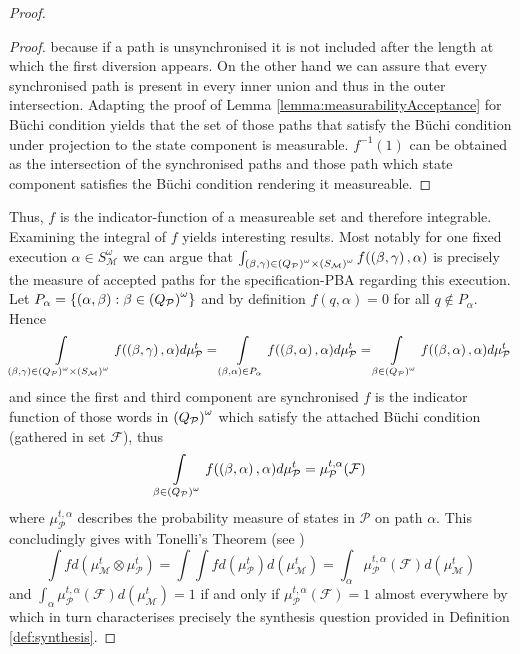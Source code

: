 \begin{proof}
\begin{proof}
  because if a path is unsynchronised it is not included after the length at
  which the first diversion appears. On the other hand we can assure that every
  synchronised path is present in every inner union and thus in the outer
  intersection. Adapting the proof of Lemma \ref{lemma:measurabilityAcceptance}
  for Büchi condition yields that the set of those paths that satisfy the Büchi
  condition under projection to the state component is measurable. $f^{-1}(1)$
  can be obtained as the intersection of the synchronised paths and those
  path which state component satisfies the Büchi condition rendering it
  measureable.
\end{proof}
Thus, $f$ is the indicator-function of a measureable set and therefore
integrable. Examining the integral of $f$ yields interesting results. Most
notably for one fixed execution $\alpha\in S_{\mathcal{M}}^{\omega}$ we can
argue that $\int_{\left(\beta,\gamma\right)\in
\left(Q_{\mathcal{P}}\right)^{\omega}\times\left(S_{\mathcal{M}}\right)^{\omega}}
f(\left(\beta,\gamma\right),\alpha)$ is precisely the measure of accepted paths for
the specification-\ac{PBA} regarding this execution. Let
$P_{\alpha} = \left\{\left(\alpha, \beta\right):\beta\in
\left(Q_{\mathcal{P}}\right)^{\omega}\right\}$ and by definition $f(q, \alpha) = 0$ for all
$q\not\in P_{\alpha}$. Hence
\begin{equation*}
  \int\limits_{\left(\beta,\gamma\right)\in
  \left(Q_{\mathcal{P}}\right)^{\omega}\times\left(S_{\mathcal{M}}\right)^{\omega}}
  f(\left(\beta,\gamma\right),\alpha)d\mu_{\mathcal{P}}^{t}
  =\int\limits_{\left(\beta,\alpha\right)\in P_{\alpha}}
  f(\left(\beta,\alpha\right),\alpha)d\mu_{\mathcal{P}}^{t}
  =\int\limits_{\beta\in\left(Q_{\mathcal{P}}\right)^{\omega}}
  f(\left(\beta,\alpha\right),\alpha)d\mu_{\mathcal{P}}^{t}
\end{equation*}
and since the first and third component are synchronised $f$ is the indicator
function of those words in $\left(Q_{\mathcal{P}}\right)^{\omega}$ which satisfy the
attached Büchi condition (gathered in set $\mathcal{F}$), thus
\begin{equation*}
  \int\limits_{\beta\in\left(Q_{\mathcal{P}}\right)^{\omega}}
  f(\left(\beta,\alpha\right),\alpha)d\mu_{\mathcal{P}}^{t}
  = \mu_{\mathcal{P}}^{t,\alpha}(\mathcal{F})
\end{equation*}
where $\mu_{\mathcal{P}}^{t,\alpha}$ describes the probability measure of
states in $\mathcal{P}$ on path $\alpha$. This concludingly gives with
Tonelli's Theorem (see \cite[Theorem 23.6]{Bauer})
\begin{equation*}
  \int f d(\mu_{\mathcal{M}}^{t}\otimes\mu_{\mathcal{P}}^{t}) =
  \int\int f d(\mu_{\mathcal{P}}^{t})d(\mu_{\mathcal{M}}^{t}) =
  \int_{\alpha}\mu_{\mathcal{P}}^{t,\alpha}(\mathcal{F})d(\mu_{\mathcal{M}}^{t})
\end{equation*}
and $\int_{\alpha}\mu_{\mathcal{P}}^{t,\alpha}(\mathcal{F})
d(\mu_{\mathcal{M}}^{t}) = 1$ if and only if
$\mu_{\mathcal{P}}^{t,\alpha}(\mathcal{F}) = 1$ almost everywhere by
\cite[Lemma 40]{RandAutoInfTrees} which in turn characterises precisely the
synthesis question provided in Definition \ref{def:synthesis}.


\end{proof}
